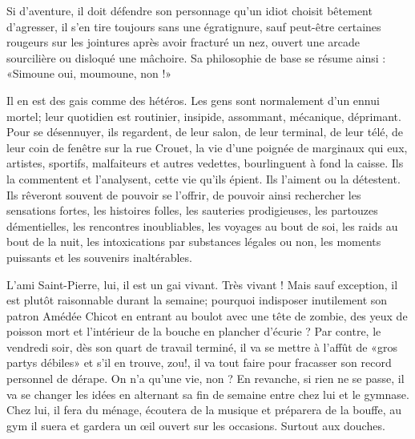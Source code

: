 
Si d’aventure, il doit défendre son personnage qu’un idiot choisit bêtement d’agresser, il s’en tire toujours sans une égratignure, sauf peut-être certaines rougeurs sur les jointures après avoir fracturé un nez, ouvert une arcade sourcilière ou disloqué une mâchoire. Sa philosophie de base se résume ainsi : «Simoune oui, moumoune, non !» 

Il en est des gais comme des hétéros. Les gens sont normalement d’un ennui mortel; leur quotidien est routinier, insipide, assommant, mécanique, déprimant. Pour se désennuyer, ils regardent, de leur salon, de leur terminal, de leur télé, de leur coin de fenêtre sur la rue Crouet, la vie d’une poignée de marginaux qui eux, artistes, sportifs, malfaiteurs et autres vedettes, bourlinguent à fond la caisse. Ils la commentent et l’analysent, cette vie qu’ils épient. Ils l’aiment ou la détestent. Ils rêveront souvent de pouvoir se l’offrir, de pouvoir ainsi rechercher les sensations fortes, les histoires folles, les sauteries prodigieuses, les partouzes démentielles, les rencontres inoubliables, les voyages au bout de soi, les raids au bout de la nuit, les intoxications par substances légales ou non, les moments puissants et les souvenirs inaltérables.

L’ami Saint-Pierre, lui, il est un gai vivant. Très vivant ! Mais sauf exception, il est plutôt raisonnable durant la semaine; pourquoi indisposer inutilement son patron Amédée Chicot en entrant au boulot avec une tête de zombie, des yeux de poisson mort et l’intérieur de la bouche en plancher d’écurie ? Par contre, le vendredi soir, dès son quart de travail terminé, il va se mettre à l’affût de «gros partys débiles» et s’il en trouve, zou!, il va tout faire pour fracasser son record personnel de dérape. On n’a qu’une vie, non ? En revanche, si rien ne se passe, il va se changer les idées en alternant sa fin de semaine entre chez lui et le gymnase. Chez lui, il fera du ménage, écoutera de la musique et préparera de la bouffe, au gym il suera et gardera un œil ouvert sur les occasions. Surtout aux douches.

